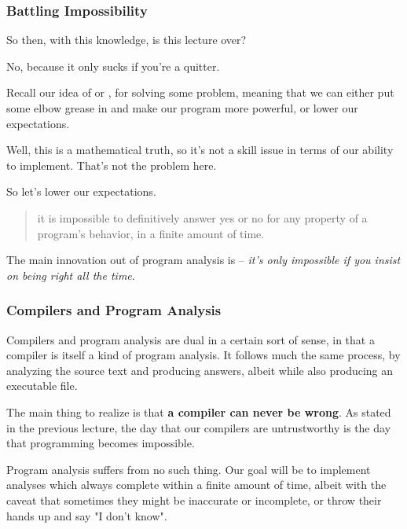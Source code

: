 \documentclass[aspectratio=169, handout]{beamer}
\begin{document}
\begin{frame}[fragile]
  \frametitle{Battling Impossibility}

  So then, with this knowledge, is this lecture over?

  \pause
  \vspace{\fill}

  No, because it only sucks if you're a quitter.

  \pause
  \vspace{\fill}

  Recall our idea of  or
  , for solving some problem, meaning that
  we can either put some elbow grease in and make our program more powerful, or
  lower our expectations.

  \pause
  \vspace{\fill}

  Well, this is a mathematical truth, so it's not a skill issue in terms of our
  ability to implement. That's not the problem here.

  \pause
  \vspace{\fill}

  So let's lower our expectations.

  \pause
  \begin{quote}
    it is impossible to definitively answer yes or no for any property of a
    program's behavior, in a finite amount of time.
  \end{quote}

  \pause
  \vspace{\fill}

  The main innovation out of program analysis is -- \textit{it's only impossible if
  you insist on being right all the time}.
\end{frame}

\begin{frame}[fragile]
  \frametitle{Compilers and Program Analysis}

  Compilers and program analysis are dual in a certain sort of sense, in that
  a compiler is itself a kind of program analysis. It follows much the same
  process, by analyzing the source text and producing answers, albeit while
  also producing an executable file.

  \pause
  \vspace{\fill}

  The main thing to realize is that \textbf{a compiler can never be wrong}.
  As stated in the previous lecture, the day that our compilers are untrustworthy
  is the day that programming becomes impossible.

  \pause
  \vspace{\fill}

  Program analysis suffers from no such thing. Our goal will be to implement
  analyses which always complete within a finite amount of time, albeit with
  the caveat that sometimes they might be inaccurate or incomplete, or throw their
  hands up and say "I don't know".
\end{frame}
\end{document}
